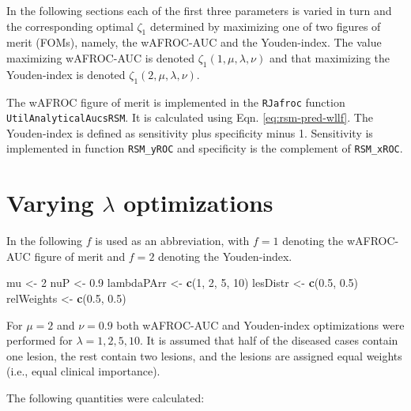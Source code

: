 \documentclass[
]{book}
\newenvironment{Shaded}{\begin{snugshade}}{\end{snugshade}}
\newcommand{\DecValTok}[1]{\textcolor[rgb]{0.00,0.00,0.81}{#1}}
\newcommand{\FloatTok}[1]{\textcolor[rgb]{0.00,0.00,0.81}{#1}}
\newcommand{\KeywordTok}[1]{\textcolor[rgb]{0.13,0.29,0.53}{\textbf{#1}}}
\newcommand{\NormalTok}[1]{#1}
\newcommand{\StringTok}[1]{\textcolor[rgb]{0.31,0.60,0.02}{#1}}
\begin{document}
In the following sections each of the first three parameters is varied in turn and the corresponding optimal \(\zeta_1\) determined by maximizing one of two figures of merit (FOMs), namely, the wAFROC-AUC and the Youden-index. The value maximizing wAFROC-AUC is denoted \(\zeta_{1} \left ( 1, \mu, \lambda, \nu \right )\) and that maximizing the Youden-index is denoted \(\zeta_{1} \left ( 2, \mu, \lambda, \nu \right )\).

The wAFROC figure of merit is implemented in the \texttt{RJafroc} function \texttt{UtilAnalyticalAucsRSM}. It is calculated using Eqn. \eqref{eq:rsm-pred-wllf}. The Youden-index is defined as sensitivity plus specificity minus 1. Sensitivity is implemented in function \texttt{RSM\_yROC} and specificity is the complement of \texttt{RSM\_xROC}.

\hypertarget{optim-op-point-vary-lambda}{%
\section{\texorpdfstring{Varying \(\lambda\) optimizations}{Varying \textbackslash lambda optimizations}}\label{optim-op-point-vary-lambda}}

In the following \(f\) is used as an abbreviation, with \(f = 1\) denoting the wAFROC-AUC figure of merit and \(f = 2\) denoting the Youden-index.

\begin{Shaded}
\begin{Highlighting}[]
\NormalTok{mu <-}\StringTok{ }\DecValTok{2}
\NormalTok{nuP <-}\StringTok{ }\FloatTok{0.9}
\NormalTok{lambdaPArr <-}\StringTok{ }\KeywordTok{c}\NormalTok{(}\DecValTok{1}\NormalTok{, }\DecValTok{2}\NormalTok{, }\DecValTok{5}\NormalTok{, }\DecValTok{10}\NormalTok{)}
\NormalTok{lesDistr <-}\StringTok{ }\KeywordTok{c}\NormalTok{(}\FloatTok{0.5}\NormalTok{, }\FloatTok{0.5}\NormalTok{)}
\NormalTok{relWeights <-}\StringTok{ }\KeywordTok{c}\NormalTok{(}\FloatTok{0.5}\NormalTok{, }\FloatTok{0.5}\NormalTok{)}
\end{Highlighting}
\end{Shaded}

For \(\mu = 2\) and \(\nu = 0.9\) both wAFROC-AUC and Youden-index optimizations were performed for \(\lambda = 1, 2, 5, 10\). It is assumed that half of the diseased cases contain one lesion, the rest contain two lesions, and the lesions are assigned equal weights (i.e., equal clinical importance).

The following quantities were calculated:
\end{document}

